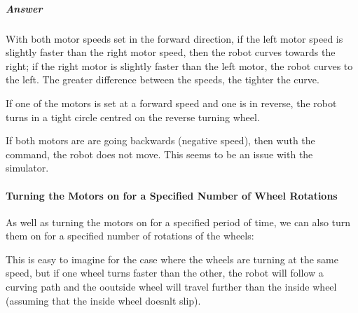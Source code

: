 \documentclass[letterpaper,10pt,english]{sphinxmanual}
\begin{document}
\subparagraph{Answer}
\label{\detokenize{content/01_Robot_Lab/Section_00_01:Answer}}

With both motor speeds set in the forward direction, if the left motor speed is slightly faster than the right motor speed, then the robot curves towards the right; if the right motor is slightly faster than the left motor, the robot curves to the left. The greater difference between the speeds, the tighter the curve.

If one of the motors is set at a forward speed and one is in reverse, the robot turns in a tight circle centred on the reverse turning wheel.

If both motors are are going backwards (negative speed), then wuth the  command, the robot does not move. This seems to be an issue with the simulator.


\paragraph{Turning the Motors on for a Specified Number of Wheel Rotations}
\label{\detokenize{content/01_Robot_Lab/Section_00_01:Turning-the-Motors-on-for-a-Specified-Number-of-Wheel-Rotations}}
As well as turning the motors on for a specified period of time, we can also turn them on for a specified number of rotations of the wheels:

\begin{sphinxVerbatim}[commandchars=\\\{\}]
  
\end{sphinxVerbatim}

This is easy to imagine for the case where the wheels are turning at the same speed, but if one wheel turns faster than the other, the robot will follow a curving path and the ooutside wheel will travel further than the inside wheel (assuming that the inside wheel doesnlt slip).

\end{document}
